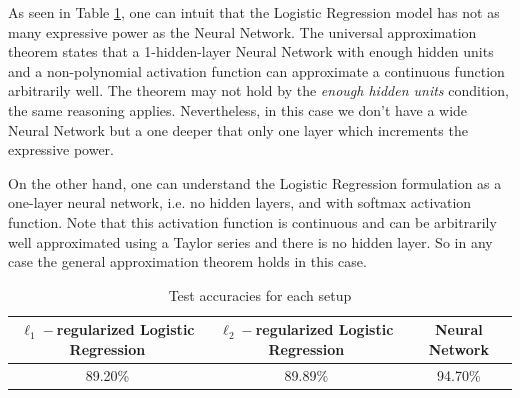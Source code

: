 \documentclass{article}
\begin{document}
As seen in Table \ref{tab:acc}, one can intuit that the Logistic Regression model has not as many expressive power as the Neural Network. The universal approximation theorem states that a 1-hidden-layer Neural Network with enough hidden units and a non-polynomial activation function can approximate a continuous function arbitrarily well. The theorem may not hold by the \textit{enough hidden units} condition, the same reasoning applies. Nevertheless, in this case we don't have a wide Neural Network but a one deeper that only one layer which increments the expressive power.

On the other hand, one can understand the Logistic Regression formulation as a one-layer neural network, i.e. no hidden layers, and with softmax activation function. Note that this activation function is continuous and can be arbitrarily well approximated using a Taylor series and there is no hidden layer. So in any case the general approximation theorem holds in this case.

\begin{table}[ht]
    \centering
    \begin{tabular}{ccc}
        \toprule
        $\ell_1-$regularized Logistic Regression &  $\ell_2-$regularized Logistic Regression & Neural Network\\
        \midrule
        89.20\% & 89.89\% & 94.70\% \\
        \bottomrule
    \end{tabular}
    \caption{Test accuracies for each setup}
    \label{tab:acc}
\end{table}
\end{document}
